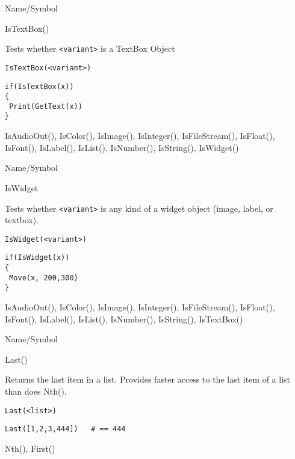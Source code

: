 \begin{desc}{Name/Symbol}
\item[Name/Symbol]	IsTextBox()

\item[Description]	Tests whether \verb+<variant>+ is a TextBox Object

\item[Usage]
\begin{verbatim}
IsTextBox(<variant>)
\end{verbatim}

\item[Example]	
\begin{verbatim}
if(IsTextBox(x))
{
 Print(GetText(x))
}
\end{verbatim}

\item[See Also]	IsAudioOut(), IsColor(), IsImage(), IsInteger(), 
		IsFileStream(), IsFloat(), IsFont(), IsLabel(),
 		IsList(), IsNumber(), IsString(),  IsWidget()
\end{desc}

\rl


\begin{desc}{Name/Symbol}
\item[Name/Symbol]	IsWidget

\item[Description]	Tests whether \verb+<variant>+ is any kind of a widget object
		(image, label, or textbox).

\item[Usage]		
\begin{verbatim}
IsWidget(<variant>)
\end{verbatim}

\item[Example]	
\begin{verbatim}
if(IsWidget(x))
{
 Move(x, 200,300)
}
\end{verbatim}

\item[See Also]	IsAudioOut(), IsColor(), IsImage(), IsInteger(), 
            	IsFileStream(), IsFloat(), IsFont(), IsLabel(),
 	   	IsList(), IsNumber(), IsString(), IsTextBox()
\end{desc}

\rl


\begin{desc}{Name/Symbol}
\item[Name/Symbol]	Last()

\item[Description]	Returns the last item in a list. Provides faster 
		access to the last item of a list than does Nth().

\item[Usage]
\begin{verbatim}
Last(<list>)
\end{verbatim}

\item[Example]
\begin{verbatim}
Last([1,2,3,444])	# == 444
\end{verbatim}

\item[See Also]	Nth(), First()
\end{desc}

